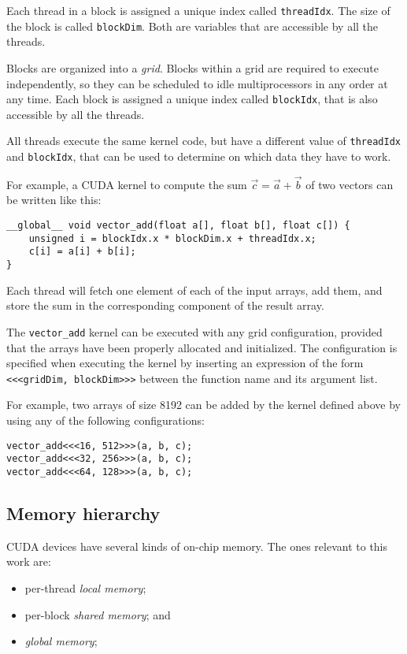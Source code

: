 Each thread in a block
is assigned a unique index
called \texttt{threadIdx}.
The size of the block
is called \texttt{blockDim}.
Both are variables that are accessible
by all the threads.

Blocks are organized into a \emph{grid}.
Blocks within a grid
are required to execute independently,
so they can be scheduled to idle multiprocessors
in any order at any time.
Each block is assigned a unique index
called \verb+blockIdx+,
that is also accessible by all the threads.

All threads execute the same kernel code,
but have a different value of \verb+threadIdx+ and \verb+blockIdx+,
that can be used to determine on which data they have to work.

For example,
a CUDA kernel to compute the sum \(\vec c = \vec a + \vec b\) of two vectors
can be written like this:
\begin{verbatim}
__global__ void vector_add(float a[], float b[], float c[]) {
    unsigned i = blockIdx.x * blockDim.x + threadIdx.x;
    c[i] = a[i] + b[i];
}
\end{verbatim}
Each thread will fetch one element of each of the input arrays, add them,
and store the sum in the corresponding component of the result array.

The \verb+vector_add+ kernel can be executed with any grid configuration,
provided that the arrays have been properly allocated and initialized.
The configuration is specified when executing the kernel
by inserting an expression of the form \texttt{<<<gridDim, blockDim>>>}
between the function name and its argument list.

For example,
two arrays of size 8192 can be added
by the kernel defined above
by using any of the following configurations:
\begin{verbatim}
vector_add<<<16, 512>>>(a, b, c);
vector_add<<<32, 256>>>(a, b, c);
vector_add<<<64, 128>>>(a, b, c);
\end{verbatim}

\subsection{Memory hierarchy}
\label{sub:memory-hierarchy}

CUDA devices have several kinds of on-chip memory.
The ones relevant to this work are:
\begin{itemize}
  \item per-thread \emph{local memory};
  \item per-block \emph{shared memory}; and
  \item \emph{global memory};
\end{itemize}

